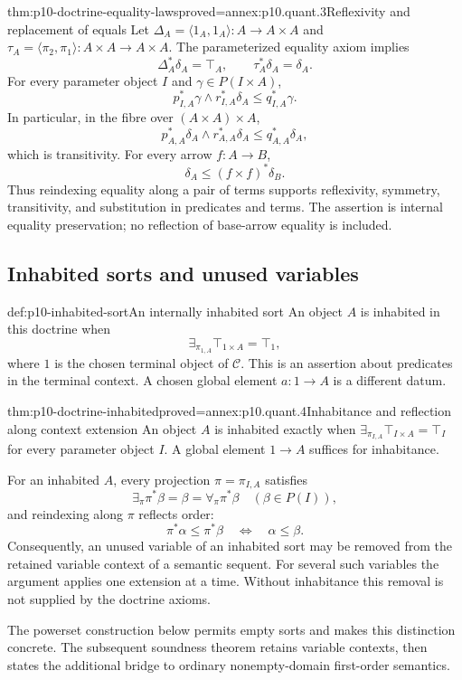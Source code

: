\begin{hbtheorem}{thm:p10-doctrine-equality-laws}{proved=annex:p10.quant.3}{Reflexivity and replacement of equals}
Let \(\Delta_A=\langle1_A,1_A\rangle:A\to A\times A\) and
\(\tau_A=\langle\pi_2,\pi_1\rangle:A\times A\to A\times A\).
The parameterized equality axiom implies
\[
                    \Delta_A^*\delta_A=\top_A,\qquad
                    \tau_A^*\delta_A=\delta_A.
\]
For every parameter object \(I\) and \(\gamma\in P(I\times A)\),
\[
                     p_{I,A}^*\gamma\wedge r_{I,A}^*\delta_A
                                  \leq q_{I,A}^*\gamma .
\]
In particular, in the fibre over \((A\times A)\times A\),
\[
                     p_{A,A}^*\delta_A\wedge r_{A,A}^*\delta_A
                                  \leq q_{A,A}^*\delta_A,
\]
which is transitivity.  For every arrow \(f:A\to B\),
\[
                             \delta_A\leq(f\times f)^*\delta_B.
\]
Thus reindexing equality along a pair of terms supports reflexivity,
symmetry, transitivity, and substitution in predicates and terms.
The assertion is internal equality preservation; no reflection
of base-arrow equality is included.
\end{hbtheorem}

\subsection{Inhabited sorts and unused variables}
\label{sec:p10-doctrine-inhabited}

\begin{hbdefinition}{def:p10-inhabited-sort}{An internally inhabited sort}
An object \(A\) is inhabited in this doctrine when
\[
                  \exists_{\pi_{1,A}}\top_{1\times A}=\top_1,
\]
where \(1\) is the chosen terminal object of \(\mathcal C\).
This is an assertion about predicates in the terminal context.
A chosen global element \(a:1\to A\) is a different datum.
\end{hbdefinition}

\begin{hbtheorem}{thm:p10-doctrine-inhabited}{proved=annex:p10.quant.4}{Inhabitance and reflection along context extension}
An object \(A\) is inhabited exactly when
\(\exists_{\pi_{I,A}}\top_{I\times A}=\top_I\) for every
parameter object \(I\).
A global element \(1\to A\) suffices for inhabitance.

For an inhabited \(A\), every projection \(\pi=\pi_{I,A}\)
satisfies
\[
                   \exists_\pi\pi^*\beta=\beta
                   =\forall_\pi\pi^*\beta
                         \quad(\beta\in P(I)),
\]
and reindexing along \(\pi\) reflects order:
\[
                    \pi^*\alpha\leq\pi^*\beta
                         \quad\Longleftrightarrow\quad
                    \alpha\leq\beta.
\]
Consequently, an unused variable of an inhabited sort may be
removed from the retained variable context of a semantic sequent.
For several such variables the argument applies one extension
at a time.  Without inhabitance this removal is not supplied by
the doctrine axioms.
\end{hbtheorem}

The powerset construction below permits empty sorts and makes
this distinction concrete.  The subsequent soundness theorem
retains variable contexts, then states the additional bridge to
ordinary nonempty-domain first-order semantics.
